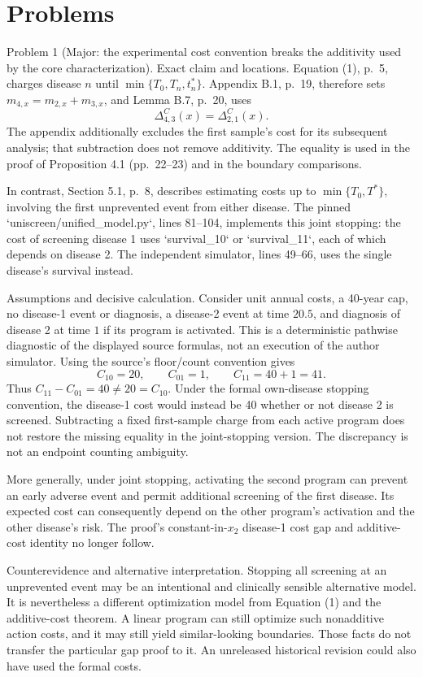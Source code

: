 \documentclass[10pt]{article}
\begin{document}
\section*{Problems}
Problem 1 (Major: the experimental cost convention breaks the additivity used by the core characterization).  Exact claim and locations. Equation (1), p. 5, charges disease \(n\) until \(\min\{T_0,T_n,t_n^*\}\). Appendix B.1, p. 19, therefore sets \(m_{4,x}=m_{2,x}+m_{3,x}\), and Lemma B.7, p. 20, uses \[\Delta^C_{4,3}(x)=\Delta^C_{2,1}(x).\] The appendix additionally excludes the first sample’s cost for its subsequent analysis; that subtraction does not remove additivity. The equality is used in the proof of Proposition 4.1 (pp. 22–23) and in the boundary comparisons.\par
In contrast, Section 5.1, p. 8, describes estimating costs up to \(\min\{T_0,T^*\}\), involving the first unprevented event from either disease. The pinned `uniscreen/unified\_model.py`, lines 81–104, implements this joint stopping: the cost of screening disease 1 uses `survival\_10` or `survival\_11`, each of which depends on disease 2. The independent simulator, lines 49–66, uses the single disease’s survival instead.\par
Assumptions and decisive calculation. Consider unit annual costs, a 40-year cap, no disease-1 event or diagnosis, a disease-2 event at time \(20.5\), and diagnosis of disease 2 at time \(1\) if its program is activated. This is a deterministic pathwise diagnostic of the displayed source formulas, not an execution of the author simulator. Using the source’s floor/count convention gives \[C_{10}=20,\qquad C_{01}=1,\qquad C_{11}=40+1=41.\] Thus \(C_{11}-C_{01}=40\ne20=C_{10}\). Under the formal own-disease stopping convention, the disease-1 cost would instead be 40 whether or not disease 2 is screened. Subtracting a fixed first-sample charge from each active program does not restore the missing equality in the joint-stopping version. The discrepancy is not an endpoint counting ambiguity.\par
More generally, under joint stopping, activating the second program can prevent an early adverse event and permit additional screening of the first disease. Its expected cost can consequently depend on the other program’s activation and the other disease’s risk. The proof’s constant-in-\(x_2\) disease-1 cost gap and additive-cost identity no longer follow.\par
Counterevidence and alternative interpretation. Stopping all screening at an unprevented event may be an intentional and clinically sensible alternative model. It is nevertheless a different optimization model from Equation (1) and the additive-cost theorem. A linear program can still optimize such nonadditive action costs, and it may still yield similar-looking boundaries. Those facts do not transfer the particular gap proof to it. An unreleased historical revision could also have used the formal costs.\par
\end{document}
